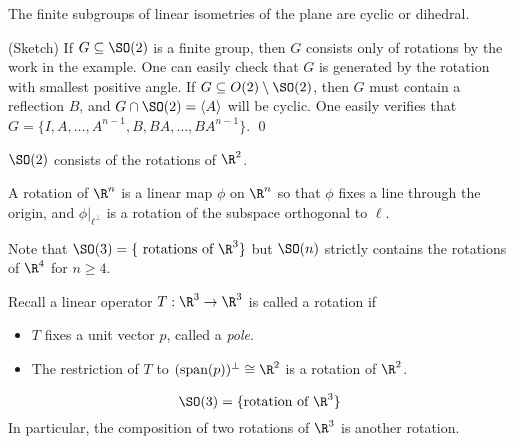 \begin{thm}
The finite subgroups of linear isometries of the plane are cyclic or dihedral. 
\end{thm}

\pf (Sketch) If $G \subseteq \SO(2)$ is a finite group, then $G$ consists only of rotations by the work in the example. One can easily check that $G$ is generated by the rotation with smallest positive angle. If $G \subseteq O(2) \setminus \SO(2)$, then $G$ must contain a reflection $B$, and $G \cap \SO(2)= \langle A \rangle$ will be cyclic. One easily verifies that $G= \{I,A, \ldots, A^{n-1}, B, BA, \ldots, BA^{n-1}\}$. \qed \\


\begin{cor}
$\SO(2)$ consists of the rotations of $\R^2$. 
\end{cor}


\begin{dfn}[Rotation of $\R^n$]
A rotation of $\R^n$ is a linear map $\phi$ on $\R^n$ so that $\phi$ fixes a line through the origin, and $\phi \big|_{\ell^\perp}$ is a rotation of the subspace orthogonal to $\ell$. 
\end{dfn}


Note that $\SO(3)=\{\text{ rotations of }\R^3\}$ but $\SO(n)$ strictly contains the rotations of $\R^4$ for $n \geq 4$.








\begin{dfn}[Rotation]
Recall a linear operator $T: \R^3 \to \R^3$ is called a rotation if
	\begin{itemize}
	\item $T$ fixes a unit vector $p$, called a \emph{pole}.
	\item The restriction of $T$ to $(\text{span}(p))^\perp \cong \R^2$ is a rotation of $\R^2$.
	\end{itemize}

\end{dfn}


\begin{thm}
	\[
	\SO(3)= \{\text{rotation of }\R^3\}
	\]
In particular, the composition of two rotations of $\R^3$ is another rotation.
\end{thm}


